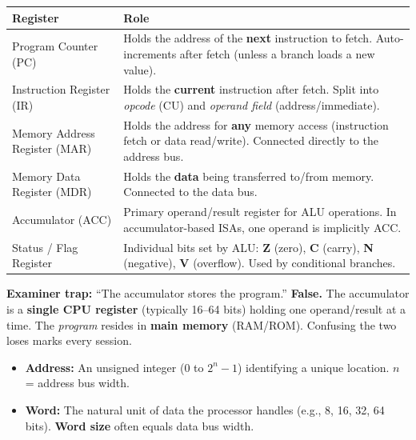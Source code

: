 \documentclass[11pt]{article}
\newcommand{\cle}[1]{{\popxbold\color{popdark}#1}}
\newcounter{popsec}
\newcounter{popsub}
\newcommand{\courssub}[1]{%
  \stepcounter{popsub}%
  \par\vspace{9pt}\noindent{\popxbold\fontsize{11.5}{13}\selectfont\color{popink}{\color{poporange}\thepopsec.\thepopsub}\hspace{6pt}#1}\par\nopagebreak\vspace{4pt}
}
\begin{document}
\begin{center}
\begin{tabularx}{\linewidth}{|l|X|}\hline
\rowcolor{popblueL}
\textbf{Register} & \textbf{Role} \\ \hline
\cle{Program Counter (PC)} & Holds the address of the \textbf{next} instruction to fetch. Auto-increments after fetch (unless a branch loads a new value). \\ \hline
\cle{Instruction Register (IR)} & Holds the \textbf{current} instruction after fetch. Split into \emph{opcode} (CU) and \emph{operand field} (address/immediate). \\ \hline
\cle{Memory Address Register (MAR)} & Holds the address for \textbf{any} memory access (instruction fetch or data read/write). Connected directly to the address bus. \\ \hline
\cle{Memory Data Register (MDR)} & Holds the \textbf{data} being transferred to/from memory. Connected to the data bus. \\ \hline
\cle{Accumulator (ACC)} & Primary operand/result register for ALU operations. In accumulator-based ISAs, one operand is implicitly ACC. \\ \hline
\cle{Status / Flag Register} & Individual bits set by ALU: \textbf{Z} (zero), \textbf{C} (carry), \textbf{N} (negative), \textbf{V} (overflow). Used by conditional branches. \\ \hline
\end{tabularx}
\end{center}

\begin{attention}
\textbf{Examiner trap:} ``The accumulator stores the program.'' \textbf{False.} The accumulator is a \textbf{single CPU register} (typically 16--64 bits) holding one operand/result at a time. The \emph{program} resides in \textbf{main memory} (RAM/ROM). Confusing the two loses marks every session.
\end{attention}

\courssub{Memory Organisation}

\begin{definition}
\begin{itemize}
\item \textbf{Address:} An unsigned integer (0 to $2^n-1$) identifying a unique location. $n$ = address bus width.
\item \textbf{Word:} The natural unit of data the processor handles (e.g., 8, 16, 32, 64 bits). \textbf{Word size} often equals data bus width.
\end{itemize}
\end{definition}
\end{document}
